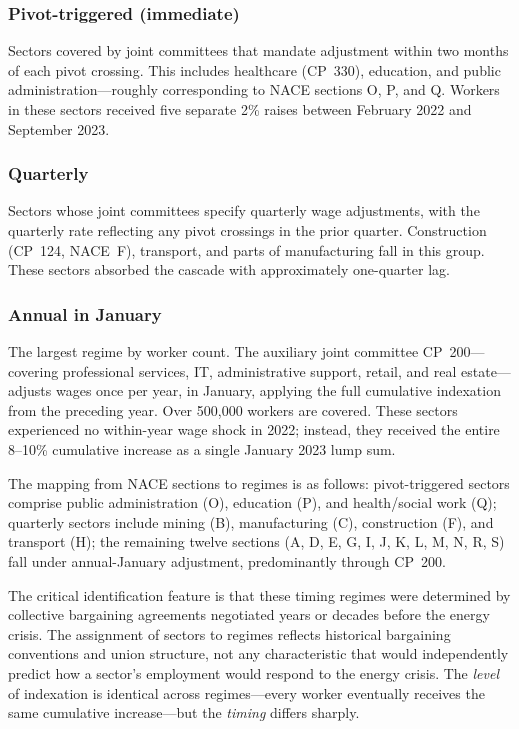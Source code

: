 \documentclass[12pt]{article}
\begin{document}
\subsubsection*{Pivot-triggered (immediate)} Sectors covered by joint committees that mandate adjustment within two months of each pivot crossing. This includes healthcare (CP~330), education, and public administration---roughly corresponding to NACE sections O, P, and Q. Workers in these sectors received five separate 2\% raises between February 2022 and September 2023.

\subsubsection*{Quarterly} Sectors whose joint committees specify quarterly wage adjustments, with the quarterly rate reflecting any pivot crossings in the prior quarter. Construction (CP~124, NACE~F), transport, and parts of manufacturing fall in this group. These sectors absorbed the cascade with approximately one-quarter lag.

\subsubsection*{Annual in January} The largest regime by worker count. The auxiliary joint committee CP~200---covering professional services, IT, administrative support, retail, and real estate---adjusts wages once per year, in January, applying the full cumulative indexation from the preceding year. Over 500,000 workers are covered. These sectors experienced no within-year wage shock in 2022; instead, they received the entire 8--10\% cumulative increase as a single January 2023 lump sum.

The mapping from NACE sections to regimes is as follows: pivot-triggered sectors comprise public administration (O), education (P), and health/social work (Q); quarterly sectors include mining (B), manufacturing (C), construction (F), and transport (H); the remaining twelve sections (A, D, E, G, I, J, K, L, M, N, R, S) fall under annual-January adjustment, predominantly through CP~200.

The critical identification feature is that these timing regimes were determined by collective bargaining agreements negotiated years or decades before the energy crisis. The assignment of sectors to regimes reflects historical bargaining conventions and union structure, not any characteristic that would independently predict how a sector's employment would respond to the energy crisis. The \textit{level} of indexation is identical across regimes---every worker eventually receives the same cumulative increase---but the \textit{timing} differs sharply.
\end{document}
